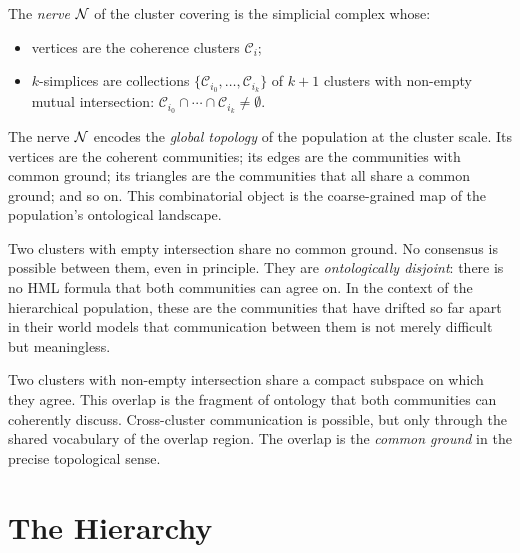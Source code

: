 \begin{definition}[Nerve]
The \emph{nerve} $\mathcal{N}$ of the cluster covering is the simplicial
complex whose:
\begin{itemize}[itemsep=2pt]
  \item vertices are the coherence clusters $\mathcal{C}_i$;
  \item $k$-simplices are collections $\{\mathcal{C}_{i_0}, \ldots,
        \mathcal{C}_{i_k}\}$ of $k+1$ clusters with non-empty
        mutual intersection:
        $\mathcal{C}_{i_0} \cap \cdots \cap \mathcal{C}_{i_k} \neq \emptyset$.
\end{itemize}
\end{definition}

\begin{remark}
The nerve $\mathcal{N}$ encodes the \emph{global topology} of the
population at the cluster scale.
Its vertices are the coherent communities; its edges are the
communities with common ground; its triangles are the communities
that all share a common ground; and so on.
This combinatorial object is the coarse-grained map of the
population's ontological landscape.
\end{remark}

\begin{remark}
Two clusters with empty intersection share no common ground.
No consensus is possible between them, even in principle.
They are \emph{ontologically disjoint}: there is no HML formula
that both communities can agree on.
In the context of the hierarchical population, these are the
communities that have drifted so far apart in their world models
that communication between them is not merely difficult but
meaningless.
\end{remark}

\begin{remark}
Two clusters with non-empty intersection share a compact subspace
on which they agree.
This overlap is the fragment of ontology that both communities
can coherently discuss.
Cross-cluster communication is possible, but only through the
shared vocabulary of the overlap region.
The overlap is the \emph{common ground} in the precise topological
sense.
\end{remark}

\section{The Hierarchy}

